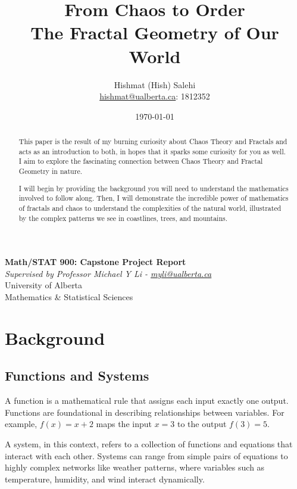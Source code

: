 \documentclass[12pt]{article}
\title{From Chaos to Order\\
       \large The Fractal Geometry of Our World}
\author{Hishmat (Hish) Salehi \\
\href{mailto:hishmat@ualberta.ca}{hishmat@ualberta.ca}: 1812352}
\date{\today}
\begin{document}
\maketitle

\begin{center}
\textbf{Math/STAT 900: Capstone Project Report}  \\
\emph{Supervised by Professor Michael Y Li - 
\href{mailto:myli@ualberta.ca}{myli@ualberta.ca}}  \\
University of Alberta \\
Mathematics \& Statistical Sciences
\end{center}

\begin{abstract}
This paper is the result of my burning curiosity about Chaos Theory and Fractals and acts as an introduction to both, in hopes that it sparks some curiosity for you as well. I aim to explore the fascinating connection between Chaos Theory and Fractal Geometry in nature. 

I will begin by providing the background you will need to understand the mathematics involved to follow along. Then, I will demonstrate the incredible power of mathematics of fractals and chaos to understand the complexities of the natural world, illustrated by the complex patterns we see in coastlines, trees, and mountains. 
\end{abstract}

\newpage

\tableofcontents

\section{Background}


\subsection{Functions and Systems}
A function is a mathematical rule that assigns each input exactly one output. Functions are foundational in describing relationships between variables. For example, \( f(x) = x + 2 \) maps the input \( x = 3 \) to the output \( f(3) = 5 \).

A system, in this context, refers to a collection of functions and equations that interact with each other. Systems can range from simple pairs of equations to highly complex networks like weather patterns, where variables such as temperature, humidity, and wind interact dynamically.
\end{document}
